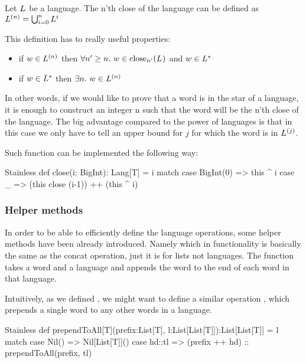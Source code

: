 \begin{definition}
	Let $L_{}$ be a language. The n'th close of the language can be defined as $ L^{(n)} = \bigcup_{i=0}^n L^{i}$
\end{definition}

This definition has to really useful properties:

\begin{itemize}
	\item if $w \in L^{(n)}$ then $\forall n' \ge n. ~ w \in \text{close}_{n'}(L_{})$ and $w \in L^{*}$
	\item if $w \in L^{*}$ then $\exists n. ~ w \in L^{(n)}$ 
\end{itemize}

In other words, if we would like to prove that a word is in the star of a language, it is enough to construct an integer n such that the word will be the n'th close of the language. The big advantage compared to the power of languages is that in this case we only have to tell an upper bound for $j$ for which the word is in $L^{(j)}$.

Such function can be implemented the following way:

\begin{ShortCode}{Stainless}
 def close(i: BigInt): Lang[T] = i match {
   case BigInt(0) => this ^ i
   case _ => (this close (i-1)) ++ (this ^ i)
 }
\end{ShortCode}

\subsubsection{Helper methods}

In order to be able to efficiently define the language operations, some helper methods have been already introduced. Namely  which in functionality is basically the same as the concat operation, just it is for lists not languages. The  function takes a word and a language and appends the word to the end of each word in that language.

Intuitively, as we defined , we might want to define a similar operation , which prepends a single word to any other words in a language.

\begin{ShortCode}{Stainless}
 def prependToAll[T](prefix:List[T], 
                     l:List[List[T]]):List[List[T]] = l match {
   case Nil() => Nil[List[T]]()
   case hd::tl => (prefix ++ hd) :: prependToAll(prefix, tl) 
 }
\end{ShortCode}

